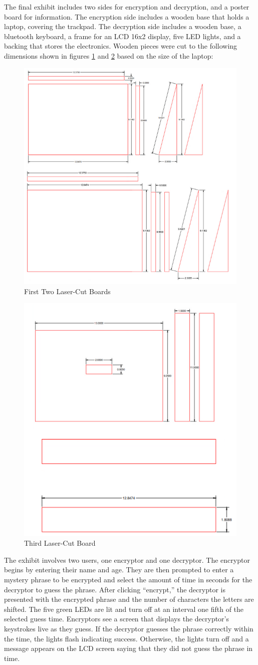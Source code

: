 \documentclass[conference]{IEEEtran}
\begin{document}
\par The final exhibit includes two sides for encryption and decryption, and a poster board for information.  The encryption side includes a wooden base that holds a laptop, covering the trackpad.  The decryption side includes a wooden base, a bluetooth keyboard, a frame for an LCD 16x2 display, five LED lights, and a backing that stores the electronics.  Wooden pieces were cut to the following dimensions shown in figures \ref{fig:LC1} and \ref{fig:LC2} based on the size of the laptop:
\begin{figure}[H]
  \centering
  \includegraphics[width=.475\textwidth]{Figures/LaserCut1.png}
  \caption{First Two Laser-Cut Boards}
  \label{fig:LC1}
\end{figure}
\begin{figure}[H]
  \centering
  \includegraphics[width=.475\textwidth]{Figures/LaserCut2.png}
  \caption{Third Laser-Cut Board}
  \label{fig:LC2}
\end{figure}
\par The exhibit involves two users, one encryptor and one decryptor.  The encryptor begins by entering their name and age.  They are then prompted to enter a mystery phrase to be encrypted and select the amount of time in seconds for the decryptor to guess the phrase.  After clicking “encrypt,” the decryptor is presented with the encrypted phrase and the number of characters the letters are shifted.  The five green LEDs are lit and turn off at an interval one fifth of the selected guess time.  
Encryptors see a screen that displays the decryptor’s keystrokes live as they guess.  If the decryptor guesses the phrase correctly within the time, the lights flash indicating success.  Otherwise, the lights turn off and a message appears on the LCD screen saying that they did not guess the phrase in time. 
\end{document}
